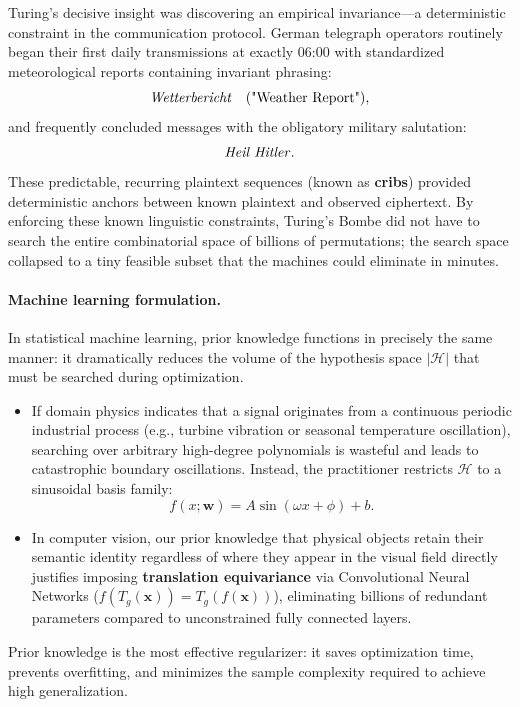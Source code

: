 Turing's decisive insight was discovering an empirical invariance—a deterministic constraint in the communication protocol. German telegraph operators routinely began their first daily transmissions at exactly 06:00 with standardized meteorological reports containing invariant phrasing:
\begin{equation}
\text{\emph{Wetterbericht}} \quad (\text{"Weather Report"}),
\end{equation}
and frequently concluded messages with the obligatory military salutation:
\begin{equation}
\text{\emph{Heil Hitler}}.
\end{equation}
These predictable, recurring plaintext sequences (known as \textbf{cribs}) provided deterministic anchors between known plaintext and observed ciphertext. By enforcing these known linguistic constraints, Turing's Bombe did not have to search the entire combinatorial space of billions of permutations; the search space collapsed to a tiny feasible subset that the machines could eliminate in minutes.

\paragraph{Machine learning formulation.}
In statistical machine learning, prior knowledge functions in precisely the same manner: it dramatically reduces the volume of the hypothesis space $|\mathcal{H}|$ that must be searched during optimization. 
\begin{itemize}[noitemsep]
  \item If domain physics indicates that a signal originates from a continuous periodic industrial process (e.g., turbine vibration or seasonal temperature oscillation), searching over arbitrary high-degree polynomials is wasteful and leads to catastrophic boundary oscillations. Instead, the practitioner restricts $\mathcal{H}$ to a sinusoidal basis family:
  \begin{equation}
  f(x; \mathbf{w}) = A \sin(\omega x + \phi) + b.
  \end{equation}
  \item In computer vision, our prior knowledge that physical objects retain their semantic identity regardless of where they appear in the visual field directly justifies imposing \textbf{translation equivariance} via Convolutional Neural Networks ($f(T_g(\mathbf{x})) = T_g(f(\mathbf{x}))$), eliminating billions of redundant parameters compared to unconstrained fully connected layers.
\end{itemize}
Prior knowledge is the most effective regularizer: it saves optimization time, prevents overfitting, and minimizes the sample complexity required to achieve high generalization.

